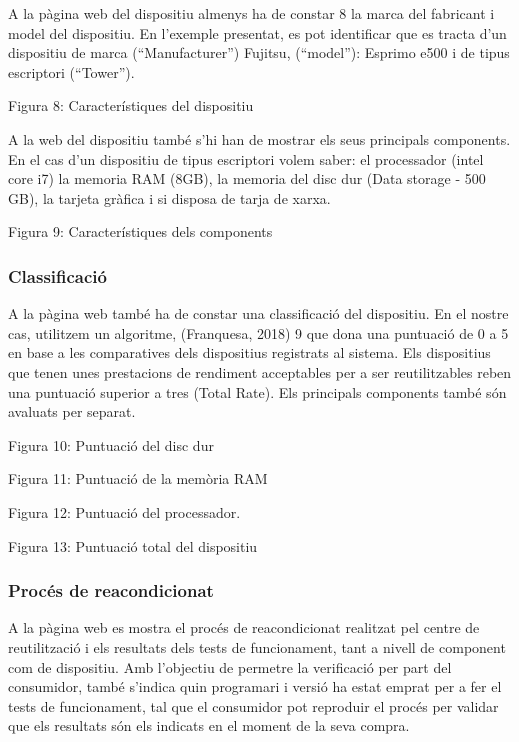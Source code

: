 \documentclass[
]{book}
\begin{document}
A la pàgina web del dispositiu almenys ha de constar 8 la marca del fabricant i model del dispositiu. En l'exemple presentat, es pot identificar que es tracta d'un dispositiu de marca (``Manufacturer'') Fujitsu, (``model''): Esprimo e500 i de tipus escriptori (``Tower'').

Figura 8: Característiques del dispositiu

A la web del dispositiu també s'hi han de mostrar els seus principals components. En el cas d'un dispositiu de tipus escriptori volem saber: el processador (intel core i7) la memoria RAM (8GB), la memoria del disc dur (Data storage - 500 GB), la tarjeta gràfica i si disposa de tarja de xarxa.

Figura 9: Característiques dels components

\hypertarget{classificaciuxf3}{%
\subsubsection{Classificació}\label{classificaciuxf3}}

A la pàgina web també ha de constar una classificació del dispositiu. En el nostre cas, utilitzem un algoritme, (Franquesa, 2018) 9 que dona una puntuació de 0 a 5 en base a les comparatives dels dispositius registrats al sistema. Els dispositius que tenen unes prestacions de rendiment acceptables per a ser reutilitzables reben una puntuació superior a tres (Total Rate). Els principals components també són avaluats per separat.

Figura 10: Puntuació del disc dur

Figura 11: Puntuació de la memòria RAM

Figura 12: Puntuació del processador.

Figura 13: Puntuació total del dispositiu

\hypertarget{procuxe9s-de-reacondicionat}{%
\subsubsection{Procés de reacondicionat}\label{procuxe9s-de-reacondicionat}}

A la pàgina web es mostra el procés de reacondicionat realitzat pel centre de reutilització i els resultats dels tests de funcionament, tant a nivell de component com de dispositiu. Amb l'objectiu de permetre la verificació per part del consumidor, també s'indica quin programari i versió ha estat emprat per a fer el tests de funcionament, tal que el consumidor pot reproduir el procés per validar que els resultats són els indicats en el moment de la seva compra.
\end{document}
